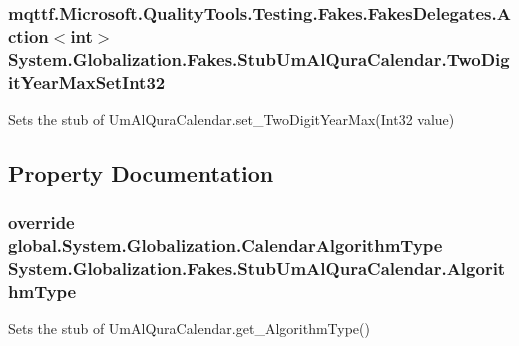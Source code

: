 \hypertarget{class_system_1_1_globalization_1_1_fakes_1_1_stub_um_al_qura_calendar_ace48504b5c287342fa2a67adb45dddef}{
\subsubsection[{Two\-Digit\-Year\-Max\-Set\-Int32}]{\setlength{\rightskip}{0pt plus 5cm}mqttf.\-Microsoft.\-Quality\-Tools.\-Testing.\-Fakes.\-Fakes\-Delegates.\-Action$<$int$>$ System.\-Globalization.\-Fakes.\-Stub\-Um\-Al\-Qura\-Calendar.\-Two\-Digit\-Year\-Max\-Set\-Int32}}\label{class_system_1_1_globalization_1_1_fakes_1_1_stub_um_al_qura_calendar_ace48504b5c287342fa2a67adb45dddef}


Sets the stub of Um\-Al\-Qura\-Calendar.\-set\-\_\-\-Two\-Digit\-Year\-Max(\-Int32 value)



\subsection{Property Documentation}
\hypertarget{class_system_1_1_globalization_1_1_fakes_1_1_stub_um_al_qura_calendar_a51786c6e4df889062f968d7f0cf3dfd5}{
\subsubsection[{Algorithm\-Type}]{\setlength{\rightskip}{0pt plus 5cm}override global.\-System.\-Globalization.\-Calendar\-Algorithm\-Type System.\-Globalization.\-Fakes.\-Stub\-Um\-Al\-Qura\-Calendar.\-Algorithm\-Type\hspace{0.3cm}{\ttfamily [get]}}}\label{class_system_1_1_globalization_1_1_fakes_1_1_stub_um_al_qura_calendar_a51786c6e4df889062f968d7f0cf3dfd5}


Sets the stub of Um\-Al\-Qura\-Calendar.\-get\-\_\-\-Algorithm\-Type()

